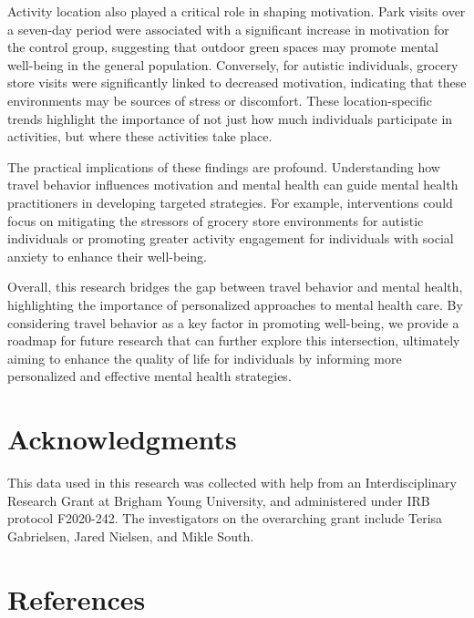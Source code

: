 \documentclass[
  letterpaper,
  number,
  review,
  3p]{elsarticle}
\begin{document}
Activity location also played a critical role in shaping motivation.
Park visits over a seven-day period were associated with a significant
increase in motivation for the control group, suggesting that outdoor
green spaces may promote mental well-being in the general population.
Conversely, for autistic individuals, grocery store visits were
significantly linked to decreased motivation, indicating that these
environments may be sources of stress or discomfort. These
location-specific trends highlight the importance of not just how much
individuals participate in activities, but where these activities take
place.

The practical implications of these findings are profound. Understanding
how travel behavior influences motivation and mental health can guide
mental health practitioners in developing targeted strategies. For
example, interventions could focus on mitigating the stressors of
grocery store environments for autistic individuals or promoting greater
activity engagement for individuals with social anxiety to enhance their
well-being.

Overall, this research bridges the gap between travel behavior and
mental health, highlighting the importance of personalized approaches to
mental health care. By considering travel behavior as a key factor in
promoting well-being, we provide a roadmap for future research that can
further explore this intersection, ultimately aiming to enhance the
quality of life for individuals by informing more personalized and
effective mental health strategies.


\section*{Acknowledgments}\label{acknowledgments}


This data used in this research was collected with help from an
Interdisciplinary Research Grant at Brigham Young University, and
administered under IRB protocol F2020-242. The investigators on the
overarching grant include Terisa Gabrielsen, Jared Nielsen, and Mikle
South.


\section*{References}\label{references}
\end{document}
